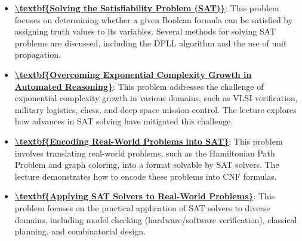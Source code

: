 \documentclass{article}%
\begin{document}
\begin{itemize}[leftmargin=*]%
\item \href{https://www.math.purdue.edu/~yipn/351/15L2-SAT.pdf#page=2}{\textbf{\textbackslash{}textbf\{Solving the Satisfiability Problem (SAT)\}}}: This problem focuses on determining whether a given Boolean formula can be satisfied by assigning truth values to its variables. Several methods for solving SAT problems are discussed, including the DPLL algorithm and the use of unit propagation.%
\item \href{https://www.math.purdue.edu/~yipn/351/15L2-SAT.pdf#page=4}{\textbf{\textbackslash{}textbf\{Overcoming Exponential Complexity Growth in Automated Reasoning\}}}: This problem addresses the challenge of exponential complexity growth in various domains, such as VLSI verification, military logistics, chess, and deep space mission control. The lecture explores how advances in SAT solving have mitigated this challenge.%
\item \href{https://www.math.purdue.edu/~yipn/351/15L2-SAT.pdf#page=40}{\textbf{\textbackslash{}textbf\{Encoding Real{-}World Problems into SAT\}}}: This problem involves translating real-world problems, such as the Hamiltonian Path Problem and graph coloring, into a format solvable by SAT solvers. The lecture demonstrates how to encode these problems into CNF formulas.%
\item \href{https://www.math.purdue.edu/~yipn/351/15L2-SAT.pdf#page=37}{\textbf{\textbackslash{}textbf\{Applying SAT Solvers to Real{-}World Problems\}}}: This problem focuses on the practical application of SAT solvers to diverse domains, including model checking (hardware/software verification), classical planning, and combinatorial design.%
\end{itemize}%
\end{document}
